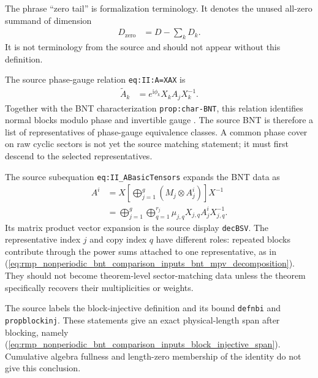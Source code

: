 \documentclass{article}
\begin{document}
The phrase ``zero tail'' is formalization terminology. It denotes the unused
all-zero summand of dimension
\begin{align}
    D_{\mathrm{zero}}
        &=
        D-\sum_k D_k.
    \label{eq:rmp_nonperiodic_bnt_comparison_inputs_zero_tail_dimension}
\end{align}
It is not terminology from the source and should not appear without this
definition.

The source phase-gauge relation \texttt{eq:II:A=XAX} is
\begin{align}
    \widetilde A_k
        &=
        e^{\mathrm{i}\phi_k}X_kA_jX_k^{-1}.
    \label{eq:rmp_nonperiodic_bnt_comparison_inputs_source_phase_gauge}
\end{align}
Together with the BNT characterization \texttt{prop:char-BNT}, this relation
identifies normal blocks modulo phase and invertible gauge
\cite[lines~264--280 and 1135--1148]{Cirac2016MPDO_arXiv}. The source BNT is
therefore a list of representatives of phase-gauge equivalence classes. A
common phase cover on raw cyclic sectors is not yet the source matching
statement; it must first descend to the selected representatives.

The source subequation \texttt{eq:II\_ABasicTensors} expands the BNT data as
\begin{align}
    A^i
        &=
        X\left[\bigoplus_{j=1}^{g}\left(M_j\otimes A_j^i\right)\right]X^{-1}
    \label{eq:rmp_nonperiodic_bnt_comparison_inputs_source_bnt_first_form}\\
        &=
        \bigoplus_{j=1}^{g}\bigoplus_{q=1}^{r_j}
        \mu_{j,q}X_{j,q}A_j^iX_{j,q}^{-1}.
    \label{eq:rmp_nonperiodic_bnt_comparison_inputs_source_bnt_copy_form}
\end{align}
Its matrix product vector expansion is the source display
\texttt{decBSV}. The representative index $j$ and copy index $q$ have
different roles: repeated blocks contribute through the power sums attached to
one representative, as in
(\ref{eq:rmp_nonperiodic_bnt_comparison_inputs_bnt_mpv_decomposition}). They
should not become theorem-level sector-matching data unless the theorem
specifically recovers their multiplicities or weights.

The source labels the block-injective definition and its bound
\texttt{defnbi} and \texttt{propblockinj}. These statements give an exact
physical-length span after blocking, namely
(\ref{eq:rmp_nonperiodic_bnt_comparison_inputs_block_injective_span}).
Cumulative algebra fullness and length-zero membership of the identity do not
give this conclusion.
\end{document}

